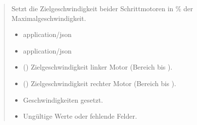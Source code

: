 \documentclass[letterpaper,10pt,english]{sphinxmanual}
\begin{document}
\begin{fulllineitems}
\label{\detokenize{agv_rest_api_stepper:post--api-agv-stepper-setVelocity}}
\pysigstartsignatures
\pysigline
{}
\pysigstopsignatures\begin{quote}\begin{description}
\sphinxAtStartPar
Setzt die Zielgeschwindigkeit beider Schrittmotoren in \% der Maximalgeschwindigkeit.

\begin{itemize}
\item {} 
\sphinxAtStartPar
{} \textendash{} application/json

\end{itemize}

\begin{itemize}
\item {} 
\sphinxAtStartPar
{} \textendash{} application/json

\end{itemize}

\begin{itemize}
\item {} 
\sphinxAtStartPar
{} () \textendash{} Zielgeschwindigkeit linker Motor (Bereich  bis ).

\item {} 
\sphinxAtStartPar
{} () \textendash{} Zielgeschwindigkeit rechter Motor (Bereich  bis ).

\end{itemize}

\begin{itemize}
\item {} 
\sphinxAtStartPar
{} \textendash{} Geschwindigkeiten gesetzt.

\item {} 
\sphinxAtStartPar
{} \textendash{} Ungültige Werte oder fehlende Felder.

\end{itemize}

\end{description}\end{quote}

\end{fulllineitems}
\end{document}
